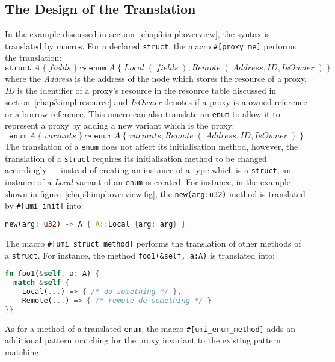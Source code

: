 \subsection{The Design of the Translation}
\label{impl:proxy}
In the example discussed in section~\ref{chap3:impl:overview}, the syntax is translated by macros. For a declared \texttt{struct}, the macro \texttt{\#[proxy\_me]} performs the translation:
\[
\texttt{struct}\; A\;\{\; \mathit{fields}\;\} \leadsto \texttt{enum}\; A\;\{\; \mathit{Local}\;(\;\mathit{fields}\;), \mathit{Remote}\;(\;\mathit{Address}, \mathit{ID}, \mathit{IsOwner}\;)\;\} 
\]
where the \textit{Address} is the address of the node which stores the resource of a proxy, \textit{ID} is the identifier of a proxy's resource in the resource table discussed in section~\ref{chap3:impl:resource} and \textit{IsOwner} denotes if a proxy is a owned reference or a borrow reference.
This macro can also translate an \texttt{enum} to allow it to represent a proxy by adding a new variant which is the proxy:
\[
\texttt{enum}\; A\;\{\; \mathit{variants}\;\} \leadsto \texttt{enum}\; A\;\{\; \mathit{variants}, \mathit{Remote}\;(\;\mathit{Address}, \mathit{ID}, \mathit{IsOwner}\;)\;\} 
\]
The translation of a \texttt{enum} does not affect its initialisation method, however, the translation of a \texttt{struct} requires its initialisation method to be changed accordingly --- instead of creating an instance of a type which is a \texttt{struct}, an instance of a \textit{Local} variant of an \texttt{enum} is created. For instance, in the example shown in figure~\ref{chap3:impl:overview:fig}, the \texttt{new(arg:u32)} method is translated by \texttt{\#[umi\_init]} into:
\begin{lstlisting}[language=Rust, style=boxed, basicstyle=\footnotesize\ttfamily]
new(arg: u32) -> A { A::Local {arg: arg} }
\end{lstlisting}

The macro \texttt{\#[umi\_struct\_method]} performs the translation of other methods of a \texttt{struct}. For instance, the method \texttt{foo1(\&self, a:A)} is translated into:
\begin{lstlisting}[language=Rust, style=boxed, basicstyle=\footnotesize\ttfamily]
fn foo1(&self, a: A) {
  match &self {
    Local(...) => { /* do something */ },
    Remote(...) => { /* remote do something */ }
}}
\end{lstlisting}
As for a method of a translated \texttt{enum}, the macro \texttt{\#[umi\_enum\_method]} adds an additional pattern matching for the proxy invariant to the existing pattern matching.

